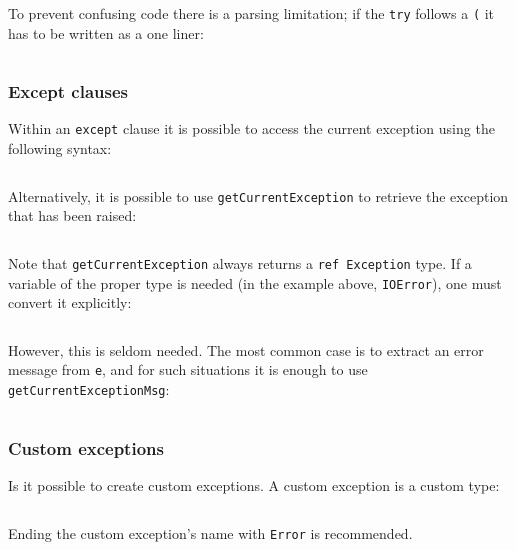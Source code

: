 To prevent confusing code there is a parsing limitation; if the
\texttt{try} follows a \texttt{(} it has to be written as a one liner:

\begin{verbatim}
\end{verbatim}

\hypertarget{except-clauses}{%
\subsubsection{Except clauses}\label{except-clauses}}

Within an \texttt{except} clause it is possible to access the current
exception using the following syntax:

\begin{verbatim}
\end{verbatim}

Alternatively, it is possible to use \texttt{getCurrentException} to
retrieve the exception that has been raised:

\begin{verbatim}
\end{verbatim}

Note that \texttt{getCurrentException} always returns a
\texttt{ref\ Exception} type. If a variable of the proper type is needed
(in the example above, \texttt{IOError}), one must convert it
explicitly:

\begin{verbatim}
\end{verbatim}

However, this is seldom needed. The most common case is to extract an
error message from \texttt{e}, and for such situations it is enough to
use \texttt{getCurrentExceptionMsg}:

\begin{verbatim}
\end{verbatim}

\hypertarget{custom-exceptions}{%
\subsubsection{Custom exceptions}\label{custom-exceptions}}

Is it possible to create custom exceptions. A custom exception is a
custom type:

\begin{verbatim}
\end{verbatim}

Ending the custom exception's name with \texttt{Error} is recommended.

